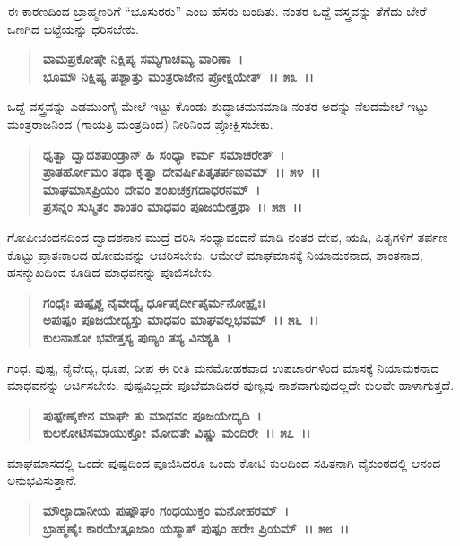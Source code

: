 ಈ ಕಾರಣದಿಂದ ಬ್ರಾಹ್ಮಣರಿಗೆ “ಭೂಸುರರು” ಎಂಬ ಹೆಸರು ಬಂದಿತು. ನಂತರ ಒದ್ದೆ ವಸ್ತ್ರವನ್ನು ತೆಗೆದು ಬೇರೆ ಒಣಗಿದ ಬಟ್ಟೆಯನ್ನು ಧರಿಸಬೇಕು.

\begin{verse}
\textbf{ವಾಮಪ್ರಕೋಷ್ಠೇ ನಿಕ್ಷಿಪ್ಯ ಸಮ್ಯಗಾಚಮ್ಯ ವಾರಿಣಾ~।}\\\textbf{ಭೂಮೌ ನಿಕ್ಷಿಷ್ಯ ಪಶ್ಚಾತ್ತು ಮಂತ್ರರಾಜೇನ ಪ್ರೋಕ್ಷಯೇತ್~।। ೫೩~।।}
\end{verse}

ಒದ್ದೆ ವಸ್ತ್ರವನ್ನು ಎಡಮುಂಗೈ ಮೇಲೆ ಇಟ್ಟು ಕೊಂಡು ಶುದ್ಧಾಚಮನಮಾಡಿ ನಂತರ ಅದನ್ನು ನೆಲದಮೇಲೆ ಇಟ್ಟು ಮಂತ್ರರಾಜನಿಂದ (ಗಾಯತ್ರಿ ಮಂತ್ರದಿಂದ) ನೀರಿನಿಂದ ಪ್ರೋಕ್ಷಿಸಬೇಕು.

\begin{verse}
\textbf{ಧೃತ್ವಾ ದ್ವಾದಶಪುಂಡ್ರಾನ್ ಹಿ ಸಂಧ್ಯಾ ಕರ್ಮ ಸಮಾಚರೇತ್~।}\\\textbf{ಪ್ರಾತರ್ಹೋಮಂ ತಥಾ ಕೃತ್ವಾ ದೇವರ್ಷಿಪಿತೃತರ್ಪಣವಮ್~।। ೫೪~।।}\\\textbf{ಮಾಘಮಾಸಪ್ರಿಯಂ ದೇವಂ ಶಂಖಚಕ್ರಗದಾಧರನಮ್~।\\ ಪ್ರಸನ್ನಂ ಸುಸ್ಮಿತಂ ಶಾಂತಂ ಮಾಧವಂ ಪೂಜಯೇತ್ತಥಾ~।। ೫೫~।।}
\end{verse}

ಗೋಪೀಚಂದನದಿಂದ ದ್ವಾದಶನಾನ ಮುದ್ರೆ ಧರಿಸಿ ಸಂಧ್ಯಾವಂದನೆ ಮಾಡಿ ನಂತರ ದೇವ, ಋಷಿ, ಪಿತೃಗಳಿಗೆ ತರ್ಪಣ ಕೊಟ್ಟು ಪ್ರಾತಃಕಾಲದ ಹೋಮವನ್ನು ಆಚರಿಸಬೇಕು. ಆಮೇಲೆ ಮಾಘಮಾಸಕ್ಕೆ ನಿಯಾಮಕನಾದ, ಶಾಂತನಾದ, ಹಸನ್ಮುಖದಿಂದ ಕೂಡಿದ ಮಾಧವನನ್ನು ಪೂಜಿಸಬೇಕು.

\begin{verse}
\textbf{ಗಂಧೈಃ ಪುಷ್ಪೈಶ್ಚ ನೈವೇದ್ಯೈ ರ್ಧೂಪೈರ್ದೀಪೈರ್ಮನೋಹ್ರೈಃ।}\\\textbf{ಅಪುಷ್ಪಂ ಪೂಜಯೇದ್ಯಸ್ತು ಮಾಧವಂ ಮಾಘವಲ್ಲಭವಮ್~।। ೫೬~।।}\\\textbf{ಕುಲನಾಶೋ ಭವೇತ್ತಸ್ಯ ಪುಣ್ಯಂ ತಸ್ಯ ವಿನಶ್ಯತಿ~।}
\end{verse}

ಗಂಧ, ಪುಷ್ಪ, ನೈವೇದ್ಯ, ಧೂಪ, ದೀಪ ಈ ರೀತಿ ಮನಮೋಹಕವಾದ ಉಪಚಾರಗಳಿಂದ ಮಾಸಕ್ಕೆ ನಿಯಾಮಕನಾದ ಮಾಧವನನ್ನು ಅರ್ಚಿಸಬೇಕು. ಪುಷ್ಪವಿಲ್ಲದೇ ಪೂಜೆಮಾಡಿದರೆ ಪುಣ್ಯವು ನಾಶವಾಗುವುದಲ್ಲದೇ ಕುಲವೇ ಹಾಳಾಗುತ್ತದೆ.

\begin{verse}
\textbf{ಪುಷ್ಪೇಣೈಕೇನ ಮಾಘೇ ತು ಮಾಧವಂ ಪೂಜಯೇದ್ಯದಿ~।}\\\textbf{ಕುಲಕೋಟಿಸಮಾಯುಕ್ತೋ ಮೋದತೇ ವಿಷ್ಣು ಮಂದಿರೇ~।। ೫೭~।।}
\end{verse}

ಮಾಘಮಾಸದಲ್ಲಿ ಒಂದೇ ಪುಷ್ಪದಿಂದ ಪೂಜಿಸಿದರೂ ಒಂದು ಕೋಟಿ ಕುಲದಿಂದ ಸಹಿತನಾಗಿ ವೈಕುಂಠದಲ್ಲಿ ಆನಂದ ಅನುಭವಿಸುತ್ತಾನೆ.

\begin{verse}
\textbf{ಮೌಲ್ಯಾದಾನೀಯ ಪುಷ್ಪೌಘಂ ಗಂಧಯುಕ್ತಂ ಮನೋಹರಮ್~।}\\\textbf{ಬ್ರಾಹ್ಮಣೈಃ ಕಾರಯೇತ್ಪೂಜಾಂ ಯಸ್ಮಾತ್ ಪುಷ್ಪಂ ಹರೇಃ ಪ್ರಿಯಮ್~।। ೫೮~।।}
\end{verse}

